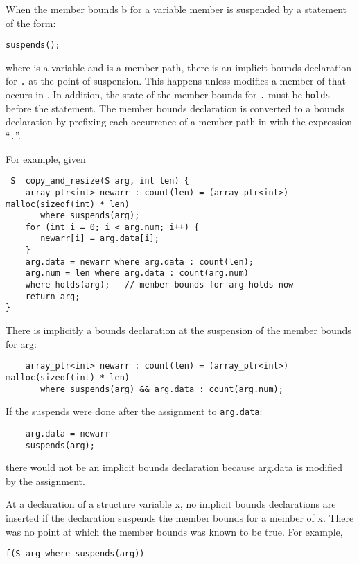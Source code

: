 When the member bounds b for a variable member is suspended by a
statement of the form:

  \texttt{suspends(}\texttt{);}

where  is a variable and  is a member path, there is an
implicit bounds declaration for \texttt{.} at the point
of suspension. This happens unless  modifies a member 
of  that occurs in . In addition, the state of the
member bounds for \texttt{.} must be \texttt{holds}
before the statement. The member bounds declaration  is
converted to a bounds declaration by prefixing each occurrence of a
member path in  with the expression ``\texttt{.}''.

For example, given

\begin{verbatim}
 S  copy_and_resize(S arg, int len) {
    array_ptr<int> newarr : count(len) = (array_ptr<int>) malloc(sizeof(int) * len)
       where suspends(arg);
    for (int i = 0; i < arg.num; i++) {
       newarr[i] = arg.data[i];
    }
    arg.data = newarr where arg.data : count(len);
    arg.num = len where arg.data : count(arg.num)
    where holds(arg);   // member bounds for arg holds now
    return arg;
}
\end{verbatim}


There is implicitly a bounds declaration at the suspension of the member
bounds for arg:

\begin{verbatim}
    array_ptr<int> newarr : count(len) = (array_ptr<int>) malloc(sizeof(int) * len)
       where suspends(arg) && arg.data : count(arg.num);
\end{verbatim}

If the suspends were done after the assignment to \texttt{arg.data}:

\begin{verbatim}
    arg.data = newarr
    suspends(arg);
\end{verbatim}

there would not be an implicit bounds declaration because arg.data is
modified by the assignment.

At a declaration of a structure variable x, no implicit bounds
declarations are inserted if the declaration suspends the member bounds
for a member of x. There was no point at which the member bounds was
known to be true. For example,

\begin{verbatim}
f(S arg where suspends(arg))
\end{verbatim}

